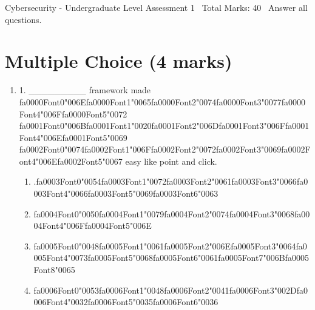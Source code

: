 \documentclass[12pt]{article}
\begin{document}
\begin{center}
Cybersecurity - Undergraduate Level Assessment 1 \
Total Marks: 40 \
Answer all questions.
\end{center}

\section*{Multiple Choice (4 marks)}
\begin{enumerate}[label=\arabic*.]
\item 1. \_\_\_\_\_\_\_\_\_ framework made {\csname fa0000Font0\endcsname\char"006E}{\csname fa0000Font1\endcsname\char"0065}{\csname fa0000Font2\endcsname\char"0074}{\csname fa0000Font3\endcsname\char"0077}{\csname fa0000Font4\endcsname\char"006F}{\csname fa0000Font5\endcsname\char"0072} {\csname fa0001Font0\endcsname\char"006B}{\csname fa0001Font1\endcsname\char"0020}{\csname fa0001Font2\endcsname\char"006D}{\csname fa0001Font3\endcsname\char"006F}{\csname fa0001Font4\endcsname\char"006E}{\csname fa0001Font5\endcsname\char"0069} {\csname fa0002Font0\endcsname\char"0074}{\csname fa0002Font1\endcsname\char"006F}{\csname fa0002Font2\endcsname\char"0072}{\csname fa0002Font3\endcsname\char"0069}{\csname fa0002Font4\endcsname\char"006E}{\csname fa0002Font5\endcsname\char"0067} easy like point and click.
\begin{enumerate}[label=(\alph*)]
    \item .{\csname fa0003Font0\endcsname\char"0054}{\csname fa0003Font1\endcsname\char"0072}{\csname fa0003Font2\endcsname\char"0061}{\csname fa0003Font3\endcsname\char"0066}{\csname fa0003Font4\endcsname\char"0066}{\csname fa0003Font5\endcsname\char"0069}{\csname fa0003Font6\endcsname\char"0063}
    \item {\csname fa0004Font0\endcsname\char"0050}{\csname fa0004Font1\endcsname\char"0079}{\csname fa0004Font2\endcsname\char"0074}{\csname fa0004Font3\endcsname\char"0068}{\csname fa0004Font4\endcsname\char"006F}{\csname fa0004Font5\endcsname\char"006E}
    \item {\csname fa0005Font0\endcsname\char"0048}{\csname fa0005Font1\endcsname\char"0061}{\csname fa0005Font2\endcsname\char"006E}{\csname fa0005Font3\endcsname\char"0064}{\csname fa0005Font4\endcsname\char"0073}{\csname fa0005Font5\endcsname\char"0068}{\csname fa0005Font6\endcsname\char"0061}{\csname fa0005Font7\endcsname\char"006B}{\csname fa0005Font8\endcsname\char"0065}
    \item {\csname fa0006Font0\endcsname\char"0053}{\csname fa0006Font1\endcsname\char"0048}{\csname fa0006Font2\endcsname\char"0041}{\csname fa0006Font3\endcsname\char"002D}{\csname fa0006Font4\endcsname\char"0032}{\csname fa0006Font5\endcsname\char"0035}{\csname fa0006Font6\endcsname\char"0036}

\end{enumerate}
\end{enumerate}
\end{document}
